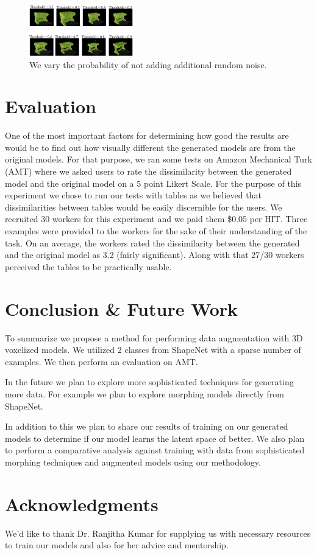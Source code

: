 \documentclass{sigchi}
\begin{document}
\begin{figure}
\includegraphics[width=0.4\textwidth]{figs/table_random.png}
\centering
\caption{We vary the probability of not adding additional random noise.}
\label{fig:table_random}
\end{figure}

\section{Evaluation}

One of the most important factors for determining how good the results are would be to find out how visually different the generated models are from the original models. For that purpose, we ran some tests on Amazon Mechanical Turk (AMT) where we asked users to rate the dissimilarity between the generated model and the original model on a 5 point Likert Scale. For the purpose of this experiment we chose to run our tests with tables as we believed that dissimilarities between tables would be easily discernible for the users. 
We recruited 30 workers for this experiment and we paid them \$0.05 per HIT. Three examples were provided to the workers for the sake of their understanding of the task. 
On an average, the workers rated the dissimilarity between the generated and the original model as 3.2 (fairly significant). Along with that 27/30 workers perceived the tables to be practically usable. 



\section{Conclusion \& Future Work}
To summarize we propose a method for performing data augmentation with 3D voxelized models. We utilized 2 classes from ShapeNet with a sparse number of examples. We then perform an evaluation on AMT.

In the future we plan to explore more sophisticated techniques for generating more data. For example we plan to explore morphing models directly from ShapeNet. 

In addition to this we plan to share our results of training on our generated models to determine if our model learns the latent space of better. We also plan to perform a comparative analysis against training with data from sophisticated morphing techniques and augmented models using our methodology.


\section{Acknowledgments}
We'd like to thank Dr. Ranjitha Kumar for supplying us with necessary resources to train our models and also for her advice and mentorship.
\balance




\end{document}
